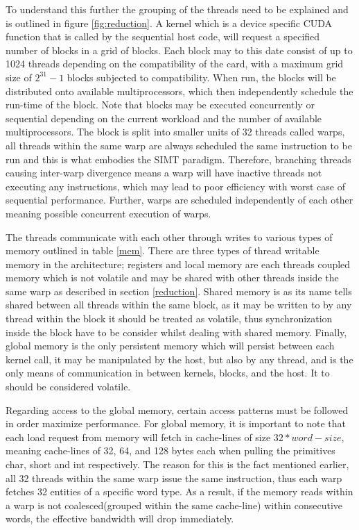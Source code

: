 \documentclass{aamas2012}
\begin{document}
To understand this further the grouping of the threads need to be explained and is outlined in figure \ref{fig:reduction}.
A kernel which is a device specific CUDA function that is called by the sequential host code,
will request a specified number of blocks in a grid of blocks.
Each block may to this date consist of up to 1024 threads depending on the compatibility of the card, with a maximum
grid size of $2^{31}-1$ blocks subjected to compatibility. When run, the blocks will be distributed onto available multiprocessors,
which then independently schedule the run-time of the block. Note that blocks may be executed concurrently or sequential depending on
the current workload and the number of available multiprocessors.
The block is split into smaller units of 32 threads called warps, all threads within the same warp are always scheduled
the same instruction to be run and this is what embodies the SIMT paradigm. 
Therefore, branching threads causing inter-warp divergence means a warp will have inactive threads not executing any instructions, 
which may lead to poor efficiency with worst case of sequential performance. Further, warps are scheduled independently of each other
meaning possible concurrent execution of warps.

The threads communicate with each other through writes to various types of memory outlined in table \ref{mem}.
There are three types of thread writable memory in the architecture; registers and local memory are each threads
coupled memory which is not volatile and may be shared with other threads inside the same warp as described in section \ref{reduction}. 
Shared memory is as its name tells shared between all threads within the same block, as it may be written to by any thread within the block
it should be treated as volatile, thus synchronization inside the block have to be consider whilst dealing with shared memory.
Finally, global memory is the only persistent memory which will persist between each kernel call, it may be manipulated by the host,
but also by any thread, and is the only means of communication in between kernels, blocks, and the host. It to should be considered volatile.

Regarding access to the global memory, certain access patterns must be followed in order maximize performance. 
For global memory, it is important to note that each load request from memory will fetch in cache-lines of size $32*word-size$,
meaning cache-lines of 32, 64, and 128 bytes each when pulling the primitives char, short and int respectively.
The reason for this is the fact mentioned earlier, all 32 threads within the same warp issue the same instruction, 
thus each warp fetches 32 entities of a specific word type.
As a result, if the memory reads within a warp is not coalesced(grouped within the same cache-line) within consecutive words, the effective bandwidth will drop immediately.
\end{document}
